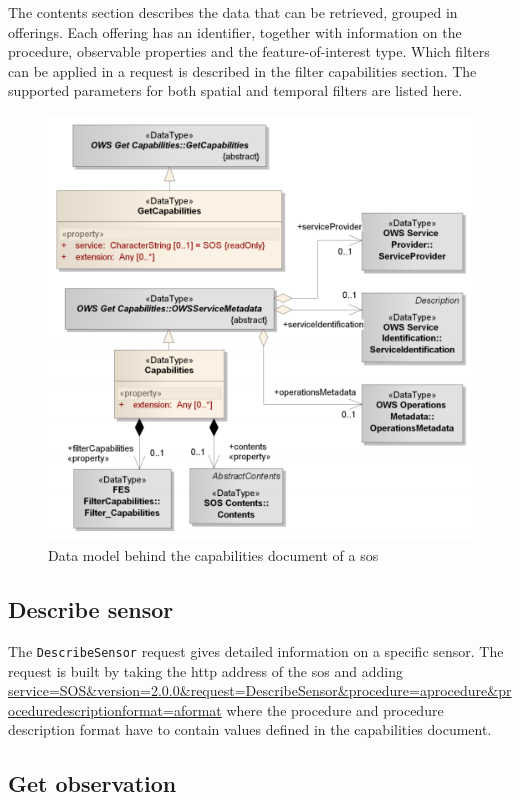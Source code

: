 The contents section describes the data that can be retrieved, grouped in offerings. Each offering has an identifier, together with information on the procedure, observable properties and the feature-of-interest type. Which filters can be applied in a request is described in the filter capabilities section. The supported parameters for both spatial and temporal filters are listed here.

\begin{figure}
	\centering
	\includegraphics[width=0.7\linewidth]{figs/SOS_2_dataModel_GetCapabilities.PNG}
	\caption{Data model behind the capabilities document of a \ac{sos} \citep{SW:OGC2}}
	\label{fig:Capabilities}
\end{figure}

\subsection{Describe sensor}

\begin{sloppypar}
The \texttt{DescribeSensor} request gives detailed information on a specific sensor. The request is built by taking the \ac{http} address of the \ac{sos} and adding \url{service=SOS\&version=2.0.0\&request=DescribeSensor\&procedure=aprocedure\&proceduredescriptionformat=aformat} where the procedure and procedure description format have to contain values defined in the capabilities document.
\end{sloppypar}

\subsection{Get observation}

